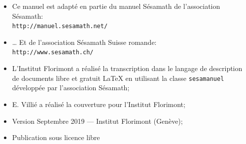 \documentclass[TS]{sesamanuel}
\begin{document}
\begin{prerequis}
\begin{itemize}
\item  Ce manuel est adapté en partie du manuel Sésamath de l'association Sésamath:\\
\texttt{http://manuel.sesamath.net/}
\item … Et de l'association Sésamath Suisse romande:\\ \texttt{http://www.sesamath.ch/}
\item L'Institut Florimont a réalisé la transcription dans le langage de description de documents libre et gratuit \LaTeX{} en utilisant la classe \texttt{sesamanuel} développée par l'association Sésamath;
\item E. Villié a réalisé la couverture pour l'Institut Florimont;
\item Version Septembre 2019 --- Institut Florimont (Genève);\vspace{0.3em}
\item Publication sous licence libre \hspace{1em} 
\end{itemize}
 \end{prerequis}

\vspace{1em}





\setcounter{chapter}{0}

\setcounter{page}{4}

\themaG


\themaC


%

%


%

%

%

%

%

%

\themaG


\AfficheListeMethodes
\AfficheCorriges[2]
\AfficheLexique
\end{document}
